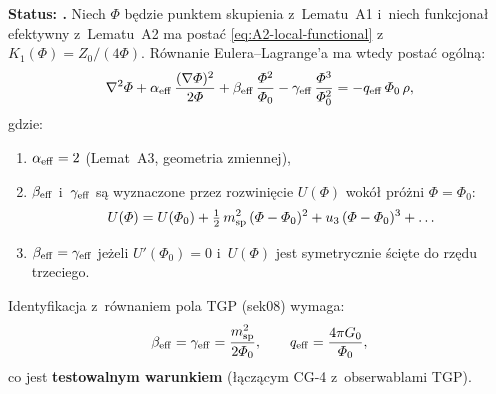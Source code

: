 \begin{lemma}%
\label{lem:A4-coefficients}
\textbf{Status: .}
Niech $\Phi$ b\k{e}dzie punktem skupienia z~Lematu~A1
i~niech funkcjona\l{} efektywny z~Lematu~A2 ma posta\'c
\eqref{eq:A2-local-functional} z~$K_1(\Phi) = Z_0/(4\Phi)$.
R\'ownanie Eulera--Lagrange'a ma wtedy posta\'c og\'oln\k{a}:
\begin{equation}
  \nabla^2\Phi + \alpha_{\rm eff}\,\frac{(\nabla\Phi)^2}{2\Phi}
  + \beta_{\rm eff}\,\frac{\Phi^2}{\Phi_0}
  - \gamma_{\rm eff}\,\frac{\Phi^3}{\Phi_0^2}
  = -q_{\rm eff}\,\Phi_0\,\rho,
  \label{eq:A4-general-PDE}
\end{equation}
gdzie:
\begin{enumerate}[nosep]
  \item $\alpha_{\rm eff} = 2$ (Lemat~A3, geometria zmiennej),
  \item $\beta_{\rm eff}$ i~$\gamma_{\rm eff}$ s\k{a} wyznaczone przez
    rozwinięcie $U(\Phi)$ wok\'o\l{} pr\'o\.zni $\Phi = \Phi_0$:
    \begin{equation}
      U(\Phi) = U(\Phi_0)
        + \tfrac{1}{2}\,m_{\rm sp}^2\,(\Phi - \Phi_0)^2
        + u_3\,(\Phi - \Phi_0)^3
        + \ldots
      \label{eq:A4-potential-expansion}
    \end{equation}
  \item $\beta_{\rm eff} = \gamma_{\rm eff}$
    je\.zeli $U'(\Phi_0) = 0$ i~$U(\Phi)$ jest symetrycznie \'sci\k{e}te
    do rz\k{e}du trzeciego.
\end{enumerate}
Identyfikacja z~r\'ownaniem pola TGP (sek08) wymaga:
\begin{equation}
  \beta_{\rm eff} = \gamma_{\rm eff}
  = \frac{m_{\rm sp}^2}{2\Phi_0},
  \qquad
  q_{\rm eff} = \frac{4\pi G_0}{\Phi_0},
  \label{eq:A4-identification}
\end{equation}
co jest \textbf{testowalnym warunkiem} (\l{}\k{a}cz\k{a}cym CG-4 z~obserwablami TGP).
\end{lemma}

